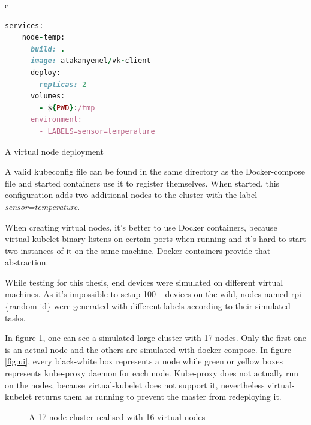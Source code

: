 \begin{code}[htpb]
  \centering
  \begin{tabular}{c}
  \begin{lstlisting}[language=ruby]
    services:
    node-temp:
      build: .
      image: atakanyenel/vk-client
      deploy:
        replicas: 2
      volumes:
        - ${PWD}:/tmp
      environment:
        - LABELS=sensor=temperature
\end{lstlisting}
\end{tabular}
\caption{A virtual node deployment}\label{fig:docker-compose}
\end{code}


A valid kubeconfig file can be found in the same directory as the Docker-compose file and started containers use it to register themselves. When started, this configuration adds two additional nodes to the cluster with the label \textit{sensor=temperature}.

When creating virtual nodes, it's better to use Docker containers, because virtual-kubelet binary listens on certain ports when running and it's hard to start two instances of it on the same machine. Docker containers provide that abstraction.

While testing for this thesis, end devices were simulated on different virtual machines. As it's impossible to setup 100+ devices on the wild, nodes named rpi-\{random-id\} were generated with different labels according to their simulated tasks.

In figure \ref{fig:largecluster}, one can see a simulated large cluster with 17 nodes. Only the first one is an actual node and the others are simulated with docker-compose. In figure \ref{fig:ui}, every black-white box represents a node while green or yellow boxes represents kube-proxy daemon for each node. Kube-proxy does not actually run on the nodes, because virtual-kubelet does not support it, nevertheless virtual-kubelet returns them as running to prevent the master from redeploying it.
\begin{figure}[htbp]
  \centering
  
  \caption{A 17 node cluster realised with 16 virtual nodes}\label{fig:largecluster}
\end{figure}



